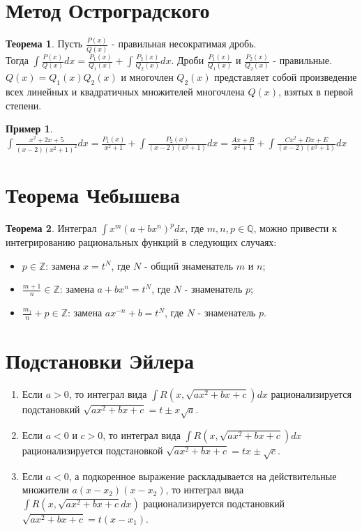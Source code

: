 \documentclass{report}
\theoremstyle{definition}
\newtheorem*{example}{Пример}
\newtheorem*{theorem}{Теорема}
\begin{document}
\section{Метод Остроградского}

\begin{theorem}
    Пусть $\frac{P(x)}{Q(x)}$ - правильная несократимая дробь. \\ Тогда $\int \frac{P(x)}{Q(x)}dx = \frac{P_{1}(x)}{Q_{1}(x)}
        + \int \frac{P_{2}(x)}{Q_{2}(x)}dx$. Дроби $\frac{P_{1}(x)}{Q_{1}(x)}$ и $\frac{P_{2}(x)}{Q_{2}(x)}$ - правильные.
    $Q(x) = Q_{1}(x) Q_{2}(x)$ и многочлен $Q_{2}(x)$ представляет собой произведение всех линейных и квадратичных множителей
    многочлена $Q(x)$, взятых в первой степени.
\end{theorem}

\begin{example}
    $\int \frac{x^{2} + 2x + 5}{(x-2)(x^{2} + 1)^{2}}dx = \frac{P_{1}(x)}{x^{2} + 1} + \int \frac{P_{2}(x)}{(x-2)(x^{2}+1)}dx
        = \frac{Ax + B}{x^{2} + 1} + \int \frac{Cx^{2} + Dx + E}{(x-2)(x^{2}+1)}dx$
\end{example}

\section{Теорема Чебышева}

\begin{theorem}
    Интеграл $\int x^m(a+bx^n)^pdx$, где $m,n,p \in \mathbb{Q}$, можно привести к интегрированию рациональных функций в следующих случаях:
    \begin{itemize}
        \item $p \in \mathbb{Z}$: замена $x = t^N$, где $N$ - общий знаменатель $m$ и $n$;
        \item $\frac{m+1}{n}\in \mathbb{Z}$: замена $a + bx^n = t^N$, где $N$ - знаменатель $p$;
        \item $\frac{m_1}{n} + p \in \mathbb{Z}$: замена $ax^{-n} + b = t^N$, где $N$ - знаменатель $p$.
    \end{itemize}
\end{theorem}

\section{Подстановки Эйлера}

\begin{enumerate}
    \item Если $a > 0$, то интеграл вида $\int R(x,\sqrt{ax^2 + bx + c})dx$ рационализируется подстановкий $\sqrt{ax^2 + bx + c} = t \pm x\sqrt{a}$.
    \item Если $a < 0$ и $c > 0$, то интеграл вида $\int R(x,\sqrt{ax^2 + bx + c})dx$ рационализируется подстановкой $\sqrt{ax^2 + bx + c} = tx \pm \sqrt{c}$.
    \item Если $a < 0$, а подкоренное выражение раскладывается на действительные множители $a(x-x_2)(x-x_2)$, то интеграл вида $\int R(x,\sqrt{ax^2 + bx + c}dx)$ рационализируется подстановкий $\sqrt{ax^2 + bx + c} = t(x-x_1)$.
\end{enumerate}
\end{document}
